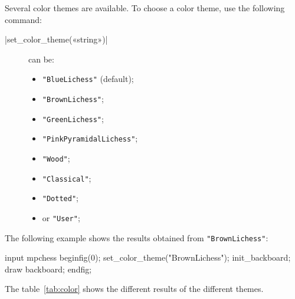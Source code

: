\documentclass[english]{ltxdoc}
\begin{document}
Several color themes are available. To choose a color theme, use the following
command:

\commande|set_color_theme(«string»)|\smallskip{}

\begin{description}
  \item[] can be:
\begin{itemize}
\item \lstinline+"BlueLichess"+ (default);
\item \lstinline+"BrownLichess"+;
\item \lstinline+"GreenLichess"+;
\item \lstinline+"PinkPyramidalLichess"+;
\item \lstinline+"Wood"+;
\item \lstinline+"Classical"+;
\item \lstinline+"Dotted"+;
\item or \lstinline+"User"+;
\end{itemize}
\end{description}

The following example shows the results obtained from \lstinline+"BrownLichess"+:
\begin{ExempleMP}
input mpchess
beginfig(0);
set_color_theme("BrownLichess");
init_backboard;
draw backboard;
endfig;
\end{ExempleMP}

The table~\ref{tab:color} shows the different results of the different themes. 
\end{document}
